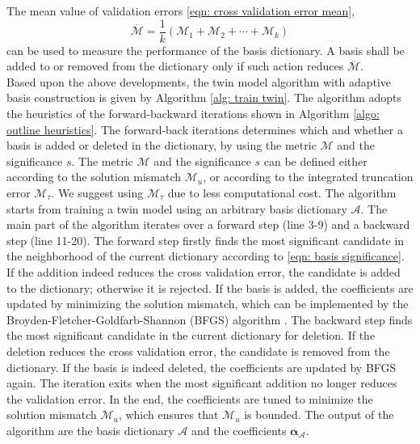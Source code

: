 The mean value of validation errors \eqref{eqn: cross validation error mean},
\begin{equation*}
    \overline{\mathcal{M}} = \frac{1}{k}\left(\mathcal{M}_1 + \mathcal{M}_2 + \cdots 
    + \mathcal{M}_k\right)
\end{equation*}
can be used to measure the performance of the basis dictionary. A basis shall be added to or removed from
the dictionary only if such action reduces $\overline{\mathcal{M}}$.\\

Based upon the above developments, the twin model algorithm with adaptive basis construction
is given by Algorithm \ref{alg: train twin}.
The algorithm adopts the heuristics of the forward-backward iterations
shown in Algorithm \ref{algo: outline heuristics}.
The forward-back iterations determines which and whether a basis is added or deleted 
in the dictionary, by using the metric $\mathcal{M}$ and the significance $s$.
The metric $\mathcal{M}$ and the significance $s$ can be defined either according to the
solution mismatch $\mathcal{M}_u$, or according to the integrated truncation error
$\mathcal{M}_{\tau}$. We suggest using $\mathcal{M}_{\tau}$ due to less computational cost.
The algorithm starts from training a twin model using 
an arbitrary basis dictionary $\mathcal{A}$. 
The main part of the algorithm iterates over a forward step (line 3-9) and a backward step (line
11-20). The forward step firstly finds the most significant candidate 
in the neighborhood of the current dictionary according to \eqref{eqn: basis significance}.
If the addition indeed reduces the cross validation error, the candidate is added 
to the dictionary; otherwise it is rejected. 
If the basis is added, the coefficients are updated by minimizing the solution mismatch, which can be
implemented by the Broyden-Fletcher-Goldfarb-Shannon (BFGS) algorithm \cite{quasiNewton}.
The backward step finds the most significant
candidate in the current dictionary for deletion. 
If the deletion reduces the cross validation error, the candidate
is removed from the dictionary. 
If the basis is indeed deleted, the coefficients are updated by BFGS again.
The iteration exits when the most significant addition no longer 
reduces the validation error. In the end, the 
coefficients are tuned to minimize the solution mismatch $\mathcal{M}_u$, which ensures that
$\mathcal{M}_u$ is bounded.
The output of the algorithm are the basis dictionary $\mathcal{A}$ and the
coefficients $\boldsymbol{\alpha}_{\mathcal{A}}$.\\

